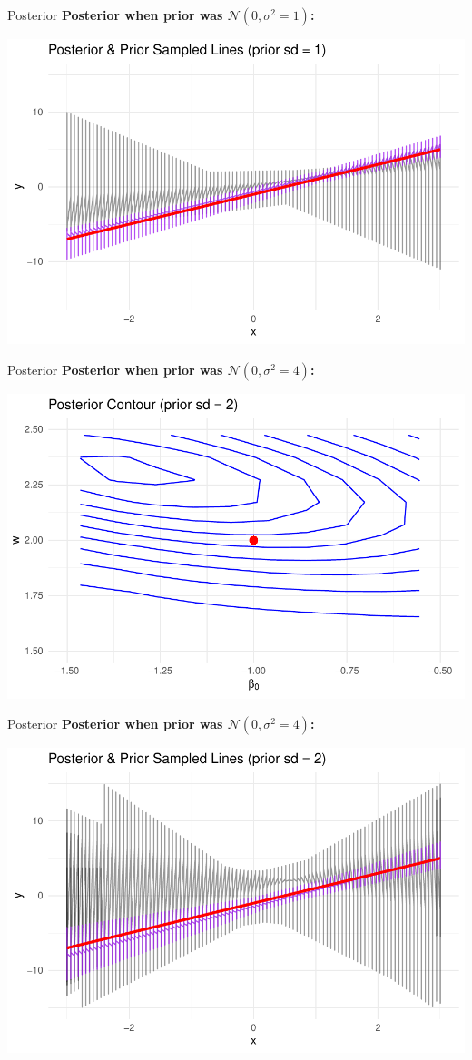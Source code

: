 \documentclass{beamer}
\begin{document}
\begin{frame}{Posterior}
  \textbf{Posterior when prior was \(\mathcal{N}(0, \sigma^2=1)\):}

  \begin{center}
    \includegraphics[width=0.8\linewidth]{posterior_lines_1.pdf}
  \end{center}
\end{frame}

\begin{frame}{Posterior}
  \textbf{Posterior when prior was \(\mathcal{N}(0, \sigma^2=4)\):}

  \begin{center}
    \includegraphics[width=0.8\linewidth]{posterior_contour_2.pdf}
  \end{center}
\end{frame}

\begin{frame}{Posterior}
  \textbf{Posterior when prior was \(\mathcal{N}(0, \sigma^2=4)\):}

  \begin{center}
    \includegraphics[width=0.8\linewidth]{posterior_lines_2.pdf}
  \end{center}
\end{frame}
\end{document}

